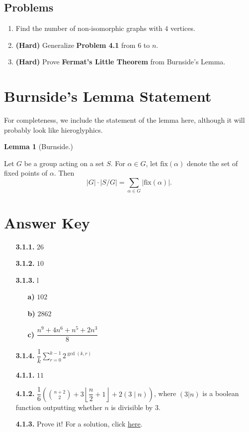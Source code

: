 \documentclass[11pt]{scrartcl}
\begin{document}
\subsection{Problems}
\begin{enumerate}
    \item Find the number of non-isomorphic graphs with $4$ vertices.
    \item \textbf{(Hard)} Generalize \color{red} \textbf{Problem 4.1} \color{black} from $6$ to $n$.
    \item \textbf{(Hard)} Prove \color{blue} \textbf{Fermat's Little Theorem} \color{black} from Burnside's Lemma.
\end{enumerate}

\section{Burnside's Lemma Statement}

For completeness, we include the statement of the lemma here, although it will probably look like hieroglyphics.

\begin{tcolorbox}[colback=orange!5!white,colframe=orange!75!black]
  \color{orange} \textbf{Lemma 1} (Burnside.)\color{black}
  \vspace{0.1cm}
  
  Let $G$ be a group acting on a set $S$. For $\alpha \in G$, let $\text{fix}(\alpha)$ denote the set of fixed points of $\alpha$. Then\[\lvert G \rvert \cdot \lvert S/G \rvert = \sum_{\alpha \in G} \lvert \text{fix}(\alpha) \rvert .\]
\end{tcolorbox}

\newpage

\section{Answer Key}

\begin{enumerate}
    \item[\textbf{3.1.1.}] $26$
    \item[\textbf{3.1.2.}] $10$
    \item[\textbf{3.1.3.}] \color{white} l \color{black}
    \begin{enumerate}
    \item[\textbf{a)}] $102$
    \item[\textbf{b)}] $2862$
    \item[\textbf{c)}] $\dfrac{n^9+4n^6+n^5+2n^3}{8}$
    \end{enumerate}
    \item[\textbf{3.1.4.}] $\dfrac{1}{k}\displaystyle\sum_{r=0}^{k-1}2^{\gcd(k,r)}$
    \item[\textbf{4.1.1.}] $11$
    \item[\textbf{4.1.2.}] $\dfrac{1}{6}\left(\displaystyle\binom{n+2}{2}+3\left\lfloor{\dfrac{n}{2}+1}\right\rfloor+2(3 \mid n)\right)$, where $(3|n)$ is a boolean function outputting whether $n$ is divisible by $3$.
    \item[\textbf{4.1.3.}] Prove it! For a solution, click \href{https://math.stackexchange.com/a/16631}{here}.
\end{enumerate}
\end{document}
